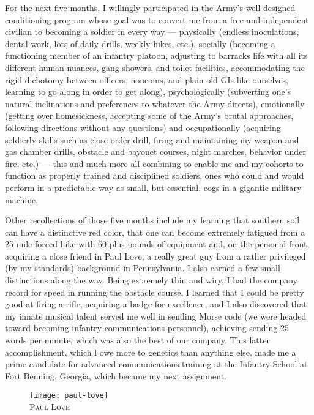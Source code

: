 \documentclass[../m3y]{subfiles}
\begin{document}
For the next five months, I willingly participated in the Army's well-designed conditioning program whose goal was to convert me from a free and independent civilian to becoming a soldier in every way --- physically (endless inoculations, dental work, lots of daily drills, weekly hikes, etc.\@), socially (becoming a functioning member of an infantry platoon, adjusting to barracks life with all its different human nuances, gang showers, and toilet facilities, accommodating the rigid dichotomy between officers, noncoms, and plain old GIs like ourselves, learning to go along in order to get along), psychologically (subverting one's natural inclinations and preferences to whatever the Army directs), emotionally (getting over homesickness, accepting some of the Army's brutal approaches, following directions without any questions) and occupationally (acquiring soldierly skills such as close order drill, firing and maintaining my weapon and gas chamber drills, obstacle and bayonet courses, night marches, behavior under fire, etc.\@) --- this and much more all combining to enable me and my cohorts to function as properly trained and disciplined soldiers, ones who could and would perform in a predictable way as small, but essential, cogs in a gigantic military machine.

Other recollections of those five months include my learning that southern soil can have a distinctive red color, that one can become extremely fatigued from a 25-mile forced hike with 60-plus pounds of equipment and, on the personal front, acquiring a close friend in Paul Love, a really great guy from a rather privileged (by my standards) background in Pennsylvania. I also earned a few small distinctions along the way. Being extremely thin and wiry, I had the company record for speed in running the obstacle course, I learned that I could be pretty good at firing a rifle, acquiring a badge for excellence, and I also discovered that my innate musical talent served me well in sending Morse code (we were headed toward becoming infantry communications personnel), achieving sending 25 words per minute, which was also the best of our company. This latter accomplishment, which l owe more to genetics than anything else, made me a prime candidate for advanced communications training at the Infantry School at Fort Benning, Georgia, which became my next assignment.

\begin{figure}
\centering
\texttt{[image: paul-love]}\\
\medskip
{\newtimes\textsc{Paul Love}}
\end{figure}
\end{document}
